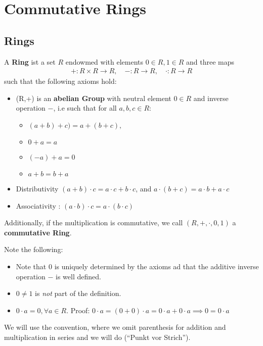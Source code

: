 \section{Commutative Rings}
\subsection{Rings}

\begin{definition}[]
	A \textbf{Ring} ist a set $R$ endowmed with elements $0 \in R, 1 \in R$ and three maps
	\begin{align*}
		+: R \times R \to R, \quad -: R \to R, \quad \cdot: R \to R
	\end{align*}
	such that the following axioms hold:
	\begin{itemize}
					\item (R,+) is an \textbf{abelian Group} with neutral element $0 \in R$ and inverse operation $-$, i.e such that for all $a,b,c \in R$:
					\begin{itemize}
									\item $(a + b) + c) = a + (b + c),$ 
									\item $0 + a = a$
									\item $(-a) + a = 0$
									\item $a + b = b + a$
					\end{itemize}
	\item Distributivity $(a + b) \cdot c = a \cdot  c + b \cdot c$, and $a \cdot (b + c) = a \cdot b + a \cdot c$	
	\item Associativity : $(a \cdot b) \cdot c = a \cdot (b \cdot c)$
\end{itemize}
Additionally, if the multiplication is commutative, we call $(R,+, \cdot, 0,1)$ a \textbf{commutative Ring}.

\end{definition}

Note the following:
\begin{itemize}
				\item Note that $0$ is uniquely determined by the axioms ad that the additive inverse operation $-$ is well defined.
				\item $0 \neq 1$ is \emph{not} part of the definition. 
				\item $0 \cdot  a = 0, \forall a \in R$. Proof: $0 \cdot a = (0 + 0) \cdot  a = 0 \cdot a + 0 \cdot  a \implies 0 = 0 \cdot  a$
\end{itemize}


We will use the convention, where we omit parenthesis for addition and multiplication in series and we will do (``Punkt vor Strich''). \\


